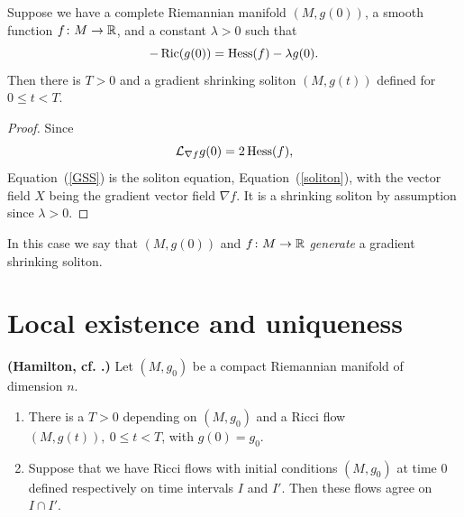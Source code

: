 \begin{proposition}\label{prop:gradient-shrinking-soliton-generation}
\label{GSSgeneration}


 Suppose we have a complete Riemannian manifold $(M,g(0))$, a
smooth function $f\colon M\to \mathbb{R}$, and a constant $\lambda>0$ such
that
\begin{equation}\label{GSS}
-\operatorname{Ric}(g(0))=\operatorname{Hess}(f)-\lambda g(0). \end{equation}
 Then there is $T>0$ and a gradient shrinking soliton
$(M,g(t))$ defined for  $0\le t<T.$ \end{proposition}

\begin{proof}
\sketch Since
$${\mathcal L}_{\nabla f}g(0)=2\operatorname{Hess}(f),$$
 Equation~(\ref{GSS}) is the soliton equation,
Equation~(\ref{soliton}), with the vector field $X$ being the
gradient vector field $\nabla f$. It is a shrinking soliton by
assumption since $\lambda>0$.
\end{proof}

\begin{definition}\label{def:gradient-shrinking-soliton-generator}



In this case we say that $(M,g(0))$ and $f\colon M\to \mathbb{R}$ {\em
generate} a gradient shrinking soliton.
\end{definition}


\section{Local existence and uniqueness}\label{3.3}

\begin{theorem}\label{thm:local-existence-uniqueness}



\label{compuniq}

{\bf (Hamilton, cf.
\cite{Hamilton3MPRC}.)} Let $(M,g_0)$ be a compact
Riemannian manifold of dimension $n$.
\begin{enumerate}
\item There is a $T>0$ depending on $(M,g_0)$ and  a Ricci flow
$(M,g(t)),\  0\le t<T$, with $g(0)=g_0$.
\item Suppose that we have Ricci flows with initial conditions $(M,g_0)$ at time
$0$ defined respectively on time intervals $I$ and $I'$. Then these
flows agree on $I\cap I'$. \end{enumerate}
\end{theorem}

